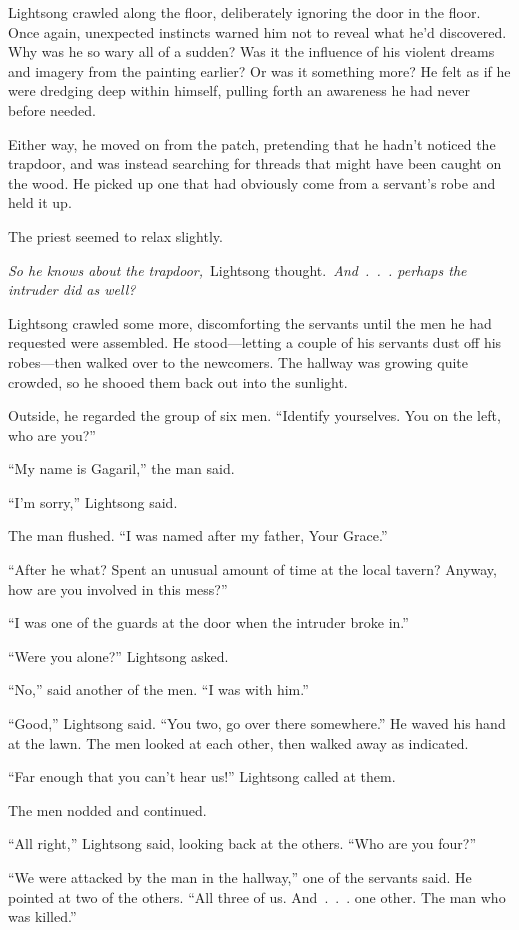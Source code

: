 Lightsong crawled along the floor, deliberately ignoring the door in the floor. Once again, unexpected instincts warned him not to reveal what he’d discovered. Why was he so wary all of a sudden? Was it the influence of his violent dreams and imagery from the painting earlier? Or was it something more? He felt as if he were dredging deep within himself, pulling forth an awareness he had never before needed.

Either way, he moved on from the patch, pretending that he hadn’t noticed the trapdoor, and was instead searching for threads that might have been caught on the wood. He picked up one that had obviously come from a servant’s robe and held it up.

The priest seemed to relax slightly.

\textit{So he knows about the trapdoor,}~Lightsong thought.~\textit{And~.~.~. perhaps the intruder did as well?}

Lightsong crawled some more, discomforting the servants until the men he had requested were assembled. He stood—letting a couple of his servants dust off his robes—then walked over to the newcomers. The hallway was growing quite crowded, so he shooed them back out into the sunlight.

Outside, he regarded the group of six men. “Identify yourselves. You on the left, who are you?”

“My name is Gagaril,” the man said.

“I’m sorry,” Lightsong said.

The man flushed. “I was named after my father, Your Grace.”

“After he what? Spent an unusual amount of time at the local tavern? Anyway, how are you involved in this mess?”

“I was one of the guards at the door when the intruder broke in.”

“Were you alone?” Lightsong asked.

“No,” said another of the men. “I was with him.”

“Good,” Lightsong said. “You two, go over there somewhere.” He waved his hand at the lawn. The men looked at each other, then walked away as indicated.

“Far enough that you can’t hear us!” Lightsong called at them.

The men nodded and continued.

“All right,” Lightsong said, looking back at the others. “Who are you four?”

“We were attacked by the man in the hallway,” one of the servants said. He pointed at two of the others. “All three of us. And~.~.~. one other. The man who was killed.”

